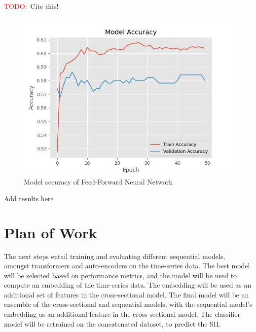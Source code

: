 \documentclass[11pt]{extarticle}
\newcommand{\todo}{\textcolor{red}{TODO:}~}
\begin{document}
\todo Cite this! \cite{antonina_dolgorukova_2024}

\begin{figure}[h!]
    \centering
    \includegraphics[scale=0.8]{"./images/model_accuracy.jpg"}
    \caption{Model accuracy of Feed-Forward Neural Network}
\end{figure}


\begin{mdframed}
    Add results here
\end{mdframed}

\section{Plan of Work} 

The next steps entail training and evaluating different sequential models, amongst transformers and auto-encoders on the time-series data. The best model will be selected based on performance metrics, and the model will be used to compute an embedding of the time-series data. The embedding will be used as an additional set of features in the cross-sectional model. The final model will be an ensemble of the cross-sectional and sequential models, with the sequential model's embedding as an additional feature in the cross-sectional model. The classifier model will be retrained on the concatenated dataset, to predict the SII.
\end{document}
